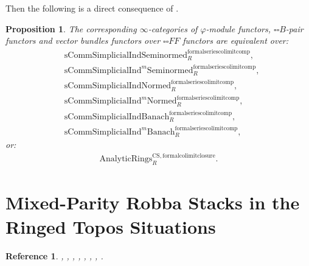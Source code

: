 \documentclass[12pt]{book}
\newtheorem{proposition}{Proposition}
\newtheorem{reference}{Reference}
\begin{document}
Then the following is a direct consequence of  \cite[Theorem 9.3.12]{KL1}.

\begin{proposition}
The corresponding $\infty$-categories of $\varphi$-module functors, ${\square\square}B$-pair functors and vector bundles functors over ${\square\square}FF$ functors are equivalent over:
\begin{align}
&\mathrm{sComm}\mathrm{Simplicial}\mathrm{Ind}\mathrm{Seminormed}^\mathrm{formalseriescolimitcomp}_R,\\
&\mathrm{sComm}\mathrm{Simplicial}\mathrm{Ind}^m\mathrm{Seminormed}^\mathrm{formalseriescolimitcomp}_R,\\
&\mathrm{sComm}\mathrm{Simplicial}\mathrm{Ind}\mathrm{Normed}^\mathrm{formalseriescolimitcomp}_R,\\
&\mathrm{sComm}\mathrm{Simplicial}\mathrm{Ind}^m\mathrm{Normed}^\mathrm{formalseriescolimitcomp}_R,\\
&\mathrm{sComm}\mathrm{Simplicial}\mathrm{Ind}\mathrm{Banach}^\mathrm{formalseriescolimitcomp}_R,\\
&\mathrm{sComm}\mathrm{Simplicial}\mathrm{Ind}^m\mathrm{Banach}^\mathrm{formalseriescolimitcomp}_R,	
\end{align}
or:
\begin{align}
\mathrm{AnalyticRings}^\mathrm{CS,formalcolimitclosure}_R.	
\end{align}	
\end{proposition}




\newpage
\section{Mixed-Parity Robba Stacks in the Ringed Topos Situations}

\begin{reference}
\cite{KL1}, \cite{KL2}, \cite{Sch1}, \cite{Sch}, \cite{Fon}, \cite{FF}, \cite{F1}, \cite{Ta}.
\end{reference}
\end{document}

